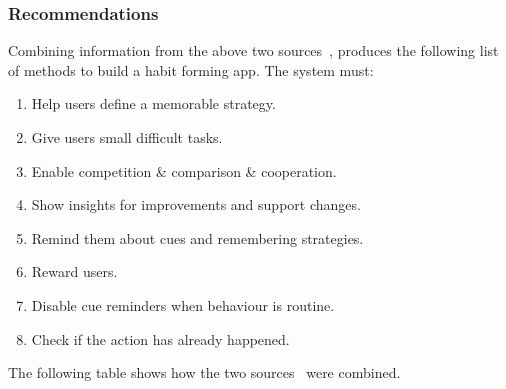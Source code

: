 \subsubsection{Recommendations}
Combining information from the above two sources~\cite{thesis_kathy, article_taxonomy_motivational_affordances_meaningful}, produces the following list of methods to build a habit forming app.\newline
\newline
The system must:

\begin{enumerate}
    \item Help users define a memorable strategy.
    \item Give users small difficult tasks.
    \item Enable competition \& comparison \& cooperation.
    \item Show insights for improvements and support changes.
    \item Remind them about cues and remembering strategies.
    \item Reward users.
    \item Disable cue reminders when behaviour is routine.
    \item Check if the action has already happened.
\end{enumerate}

The following table shows how the two sources~\cite{thesis_kathy, article_taxonomy_motivational_affordances_meaningful} were combined.


